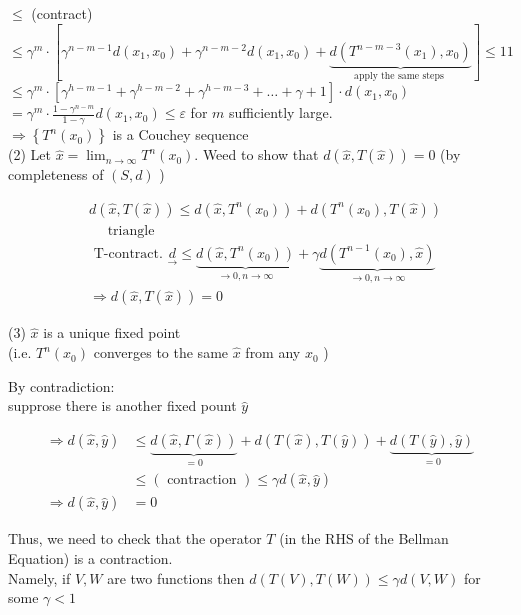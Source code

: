 \documentclass[10pt]{article}
\begin{document}
$\leqslant$ (contract) $\leqslant \gamma^{m} \cdot[\gamma^{n-m-1} d\left(x_{1}, x_{0}\right)+\gamma^{n-m-2} d\left(x_{1}, x_{0}\right)+\underbrace{d\left(T^{n-m-3}\left(x_{1}\right), x_{0}\right)}_{\text {apply the same steps }}] \leqslant 11$\\
$\leqslant \gamma^{m} \cdot\left[\gamma^{h-m-1}+\gamma^{h-m-2}+\gamma^{h-m-3}+\ldots+\gamma+1\right] \cdot d\left(x_{1}, x_{0}\right)$\\
$=\gamma^{m} \cdot \frac{1-\gamma^{n-m}}{1-\gamma} d\left(x_{1}, x_{0}\right) \leq \varepsilon$ for $m$ sufficiently large.\\
$\Rightarrow\left\{T^{n}\left(x_{0}\right)\right\}$ is a Couchey sequence\\
(2) Let $\hat{x}=\lim _{n \rightarrow \infty} T^{n}\left(x_{0}\right)$. Weed to show that $d(\hat{x}, T(\hat{x}))=0$ (by completeness of $(S, d)$ )

$$
\begin{aligned}
& d(\hat{x}, T(\hat{x})) \leq d\left(\hat{x}, T^{n}\left(x_{0}\right)\right)+d\left(T^{n}\left(x_{0}\right), T(\hat{x})\right) \\
& \quad \text { triangle } \\
& \text { T-contract. } \underset{\rightarrow}{d} \leqslant \underbrace{d\left(\hat{x}, T^{n}\left(x_{0}\right)\right)}_{\rightarrow 0, n \rightarrow \infty}+\gamma \underbrace{d\left(T^{n-1}\left(x_{0}\right), \hat{x}\right)}_{\rightarrow 0, n \rightarrow \infty} \\
& \Rightarrow d(\hat{x}, T(\hat{x}))=0
\end{aligned}
$$

(3) $\hat{x}$ is a unique fixed point\\
(i.e. $T^{n}\left(x_{0}\right)$ converges to the same $\hat{x}$ from any $x_{0}$ )

By contradiction:\\
supprose there is another fixed pount $\hat{y}$

$$
\begin{aligned}
\Rightarrow d(\hat{x}, \hat{y}) & \leqslant \underbrace{d(\hat{x}, \Gamma(\hat{x}))}_{=0}+d(T(\hat{x}), T(\hat{y}))+\underbrace{d(T(\hat{y}), \hat{y})}_{=0} \\
& \leqslant(\text { contraction }) \leqslant \gamma d(\hat{x}, \hat{y}) \\
\Rightarrow d(\hat{x}, \hat{y}) & =0
\end{aligned}
$$

Thus, we need to check that the operator $T$ (in the RHS of the Bellman Equation) is a contraction.\\
Namely, if $V, W$ are two functions then $d(T(V), T(W)) \leq \gamma d(V, W)$ for some $\gamma<1$
\end{document}
